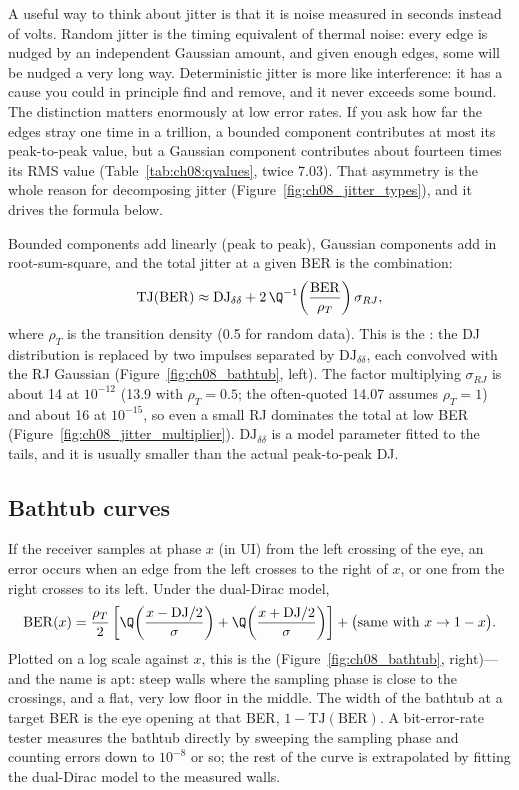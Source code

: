 A useful way to think about jitter is that it is noise measured in seconds instead of volts.
Random jitter is the timing equivalent of thermal noise: every edge is nudged by an
independent Gaussian amount, and given enough edges, some will be nudged a very long way.
Deterministic jitter is more like interference: it has a cause you could in principle find and
remove, and it never exceeds some bound. The distinction matters enormously at low error
rates. If you ask how far the edges stray one time in a trillion, a bounded component
contributes at most its peak-to-peak value, but a Gaussian component contributes about
fourteen times its RMS value (Table~\ref{tab:ch08:qvalues}, twice 7.03). That asymmetry is the
whole reason for decomposing jitter (Figure~\ref{fig:ch08_jitter_types}), and it drives the
formula below.

Bounded components add linearly (peak to peak), Gaussian components add in root-sum-square,
and the total jitter at a given BER is the combination:
\begin{equation}
\mathrm{TJ}(\mathrm{BER})\approx\mathrm{DJ}_{\delta\delta}+2\,\Q^{-1}\!\left(\frac{\mathrm{BER}}{\rho_T}\right)\sigma_{RJ},
\label{eq:ch08:tj}
\end{equation}
where $\rho_T$ is the transition density (0.5 for random data). This is the : the DJ distribution is replaced by two impulses separated by $\mathrm{DJ}_{\delta\delta}$,
each convolved with the RJ Gaussian (Figure~\ref{fig:ch08_bathtub}, left). The factor multiplying
$\sigma_{RJ}$ is about 14 at $10^{-12}$ (13.9 with $\rho_T=0.5$; the often-quoted 14.07
assumes $\rho_T=1$) and about 16 at $10^{-15}$, so even a small RJ dominates
the total at low BER (Figure~\ref{fig:ch08_jitter_multiplier}).
$\mathrm{DJ}_{\delta\delta}$ is a model parameter fitted to the tails, and it is usually smaller
than the actual peak-to-peak DJ.

\subsection{Bathtub curves}

If the receiver samples at phase $x$ (in UI) from the left crossing of the eye, an error occurs
when an edge from the left crosses to the right of $x$, or one from the right crosses to its
left. Under the dual-Dirac model,
\begin{equation}
\mathrm{BER}(x)=\frac{\rho_T}{2}\left[\Q\!\left(\frac{x-\mathrm{DJ}/2}{\sigma}\right)+\Q\!\left(\frac{x+\mathrm{DJ}/2}{\sigma}\right)\right]+\big(\text{same with }x\to1-x\big).
\end{equation}
Plotted on a log scale against $x$, this is the 
(Figure~\ref{fig:ch08_bathtub}, right)---and the name is apt: steep walls where the sampling
phase is close to the crossings, and a flat, very low floor in the middle. The width of the
bathtub at a target BER is the eye opening at that BER, $1-\mathrm{TJ}(\mathrm{BER})$. A
bit-error-rate tester measures the bathtub directly by sweeping the sampling phase and counting
errors down to $10^{-8}$ or so; the rest of the curve is extrapolated by fitting the dual-Dirac
model to the measured walls.

